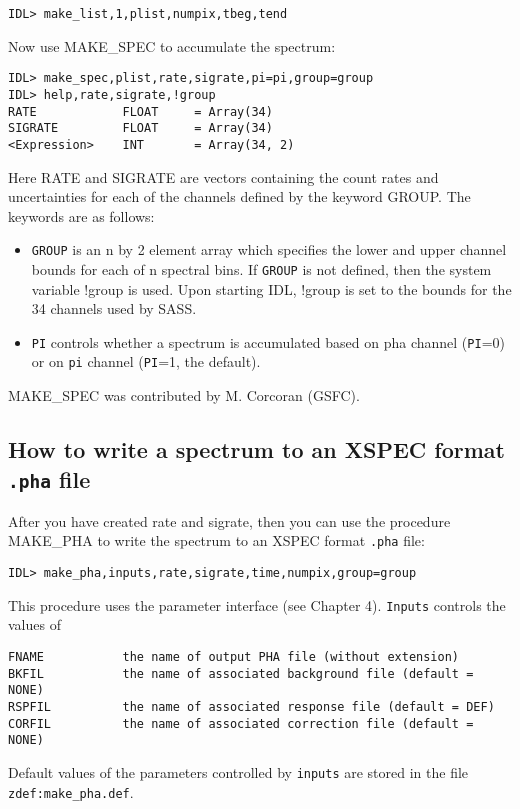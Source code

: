 \medskip\noindent
\begin{verbatim}
IDL> make_list,1,plist,numpix,tbeg,tend
\end{verbatim}
Now use MAKE{\_}SPEC to accumulate the spectrum:

\medskip\noindent
\begin{verbatim}
IDL> make_spec,plist,rate,sigrate,pi=pi,group=group
IDL> help,rate,sigrate,!group
RATE            FLOAT     = Array(34)
SIGRATE         FLOAT     = Array(34)
<Expression>    INT       = Array(34, 2)
\end{verbatim}
Here RATE and SIGRATE are vectors containing the count rates and uncertainties
for each of the channels defined by the keyword GROUP.  The keywords are as
follows:

\begin{itemize}
\item  {\tt GROUP} is an n by 2 element array which specifies the lower and upper
channel bounds for each of n spectral bins. If {\tt GROUP} is not defined, then
the system variable !group is used. Upon starting IDL, !group is set to
the bounds for the 34 channels used by SASS.
 
\item  {\tt PI} controls whether a spectrum is accumulated based on pha channel ({\tt PI}=0)
or on {\tt pi} channel ({\tt PI}=1, the default).
\end{itemize}
MAKE{\_}SPEC was contributed by M. Corcoran (GSFC).
 

\subsection{How to write a spectrum to an XSPEC format {\tt .pha}  file}
 
After you have created rate and sigrate, then you can use the procedure
MAKE{\_}PHA to write the spectrum to an XSPEC format {\tt .pha} file:

\medskip\noindent
\begin{verbatim}
IDL> make_pha,inputs,rate,sigrate,time,numpix,group=group
\end{verbatim}
This procedure uses the parameter interface (see Chapter 4). {\tt Inputs} controls
the values of

\medskip\noindent
\begin{verbatim}
FNAME           the name of output PHA file (without extension)
BKFIL           the name of associated background file (default = NONE)
RSPFIL          the name of associated response file (default = DEF)
CORFIL          the name of associated correction file (default = NONE)
\end{verbatim}
Default values of the parameters controlled by {\tt inputs} are stored in the file
{\tt zdef:make{\_}pha.def}.
 
